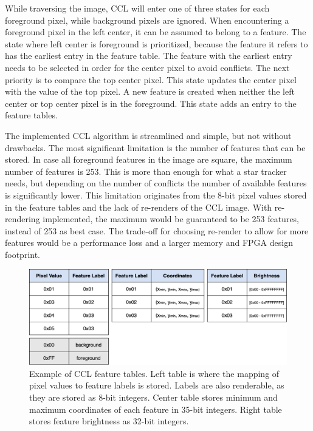 \documentclass[12pt]{report}
\begin{document}
\par
While traversing the image, CCL will enter one of three states for each foreground pixel, while background pixels are ignored. When encountering a foreground pixel in the left center, it can be assumed to belong to a feature. The state where left center is foreground is prioritized, because the feature it refers to has the earliest entry in the feature table. The feature with the earliest entry needs to be selected in order for the center pixel to avoid conflicts. The next priority is to compare the top center pixel. This state updates the center pixel with the value of the top pixel. A new feature is created when neither the left center or top center pixel is in the foreground. This state adds an entry to the feature tables.
\par
The implemented CCL algorithm is streamlined and simple, but not without drawbacks. The most significant limitation is the number of features that can be stored. In case all foreground features in the image are square, the maximum number of features is 253. This is more than enough for what a star tracker needs, but depending on the number of conflicts the number of available features is significantly lower. This limitation originates from the 8-bit pixel values stored in the feature tables and the lack of re-renders of the CCL image. With re-rendering implemented, the maximum would be guaranteed to be 253 features, instead of 253 as best case. The trade-off for choosing re-render to allow for more features would be a performance loss and a larger memory and FPGA design footprint.

\begin{figure}[h]
    \centering
    \includegraphics[scale=0.35]{figures/feature_tables.png}
    \caption{Example of CCL feature tables. Left table is where the mapping of pixel values to feature labels is stored. Labels are also renderable, as they are stored as 8-bit integers. Center table stores minimum and maximum coordinates of each feature in 35-bit integers. Right table stores feature brightness as 32-bit integers.}
    \label{fig:feature_tables}
\end{figure}
\end{document}
